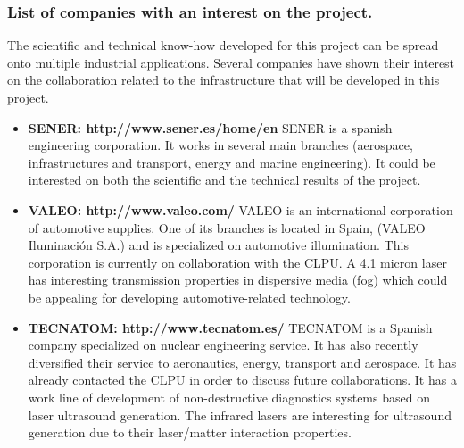 
\subsubsection*{List of companies with an interest on the project.}

The scientific and technical know-how developed for this project can be spread onto multiple industrial applications. Several companies have shown their interest on the collaboration related to the infrastructure that will be developed in this project. 

\begin{itemize}
 \item \textbf{SENER: http://www.sener.es/home/en}
SENER is a spanish engineering corporation. It works in several main branches (aerospace, infrastructures and transport, energy and marine engineering). It could be interested on both the scientific and the technical results of the project. 

\item \textbf{VALEO: http://www.valeo.com/} 
VALEO is an international corporation of automotive supplies. One of its branches is located in Spain, (VALEO Iluminaci\'on S.A.) and is specialized on automotive illumination. This corporation is currently on collaboration with the CLPU. A 4.1 micron laser has interesting transmission properties in dispersive media (fog) which could be appealing for developing automotive-related technology. 

\item \textbf{TECNATOM: http://www.tecnatom.es/}
TECNATOM is a Spanish company specialized on nuclear engineering service. It has also recently diversified their service to aeronautics, energy, transport and aerospace. It has already contacted the CLPU in order to discuss future collaborations. It has a work line of development of non-destructive diagnostics systems based on laser ultrasound generation. The infrared lasers are interesting for ultrasound generation due to their laser/matter interaction properties. 
   

\end{itemize}
